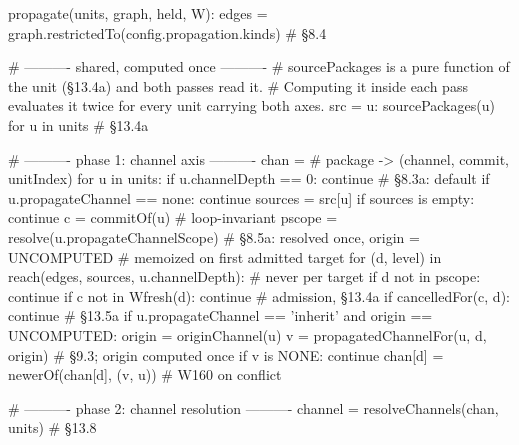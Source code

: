 \begin{speccode}[fontsize=\footnotesize]
propagate(units, graph, held, W):
    edges = graph.restrictedTo(config.propagation.kinds)          # §8.4

    # ---------- shared, computed once ----------
    # sourcePackages is a pure function of the unit (§13.4a) and both passes read it.
    # Computing it inside each pass evaluates it twice for every unit carrying both axes.
    src = { u: sourcePackages(u) for u in units }                 # §13.4a

    # ---------- phase 1: channel axis ----------
    chan = {}                                   # package -> (channel, commit, unitIndex)
    for u in units:
        if u.channelDepth == 0:                     continue      # §8.3a: default
        if u.propagateChannel == none:              continue
        sources = src[u]
        if sources is empty:                        continue
        c      = commitOf(u)                                      # loop-invariant
        pscope = resolve(u.propagateChannelScope)                 # §8.5a: resolved once,
        origin = UNCOMPUTED                                     # memoized on first admitted target
        for (d, level) in reach(edges, sources, u.channelDepth):  #   never per target
            if d not in pscope:                           continue
            if c not in Wfresh(d):                             continue # admission, §13.4a
            if cancelledFor(c, d):                        continue # §13.5a
            if u.propagateChannel == 'inherit' and origin == UNCOMPUTED:
                origin = originChannel(u)
            v = propagatedChannelFor(u, d, origin)                 # §9.3; origin computed once
            if v is NONE:                                 continue
            chan[d] = newerOf(chan[d], (v, u))                     # W160 on conflict

    # ---------- phase 2: channel resolution ----------
    channel = resolveChannels(chan, units)                         # §13.8


\end{speccode}
